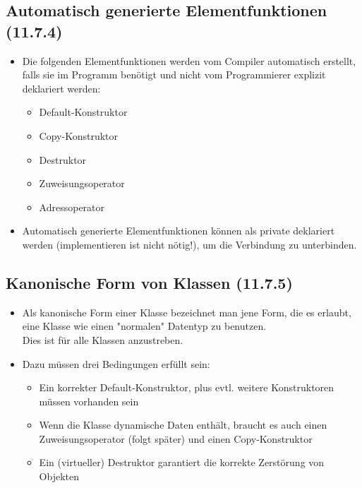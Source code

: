 \subsection{Automatisch generierte Elementfunktionen (11.7.4)}
\label{sec:Automatisch generierte Elementfunktionen (11.7.4)}
\begin{itemize}
	\item Die folgenden Elementfunktionen werden vom Compiler automatisch erstellt, falls sie im Programm benötigt und nicht vom Programmierer explizit deklariert werden:
	\begin{itemize}
		\item Default-Konstruktor
		\item Copy-Konstruktor
		\item Destruktor
		\item Zuweisungsoperator
		\item Adressoperator
	\end{itemize}
	\item Automatisch generierte Elementfunktionen können als private deklariert werden (implementieren ist nicht nötig!), um die Verbindung zu unterbinden.
\end{itemize}

\subsection{Kanonische Form von Klassen (11.7.5)}
\label{sec:Kanonische Form von Klassen (11.7.5)}
\begin{itemize}
	\item Als kanonische Form einer Klasse bezeichnet man jene Form, die es erlaubt, eine Klasse wie einen "normalen" Datentyp zu benutzen.\\
	Dies ist für alle Klassen anzustreben.
	\item Dazu müssen drei Bedingungen erfüllt sein:
	\begin{itemize}
		\item Ein korrekter Default-Konstruktor, plus evtl. weitere Konstruktoren müssen vorhanden sein
		\item Wenn die Klasse dynamische Daten enthält, braucht es auch einen Zuweisungsoperator (folgt später) und einen Copy-Konstruktor
		\item Ein (virtueller) Destruktor garantiert die korrekte Zerstörung von Objekten
	\end{itemize}
\end{itemize}

